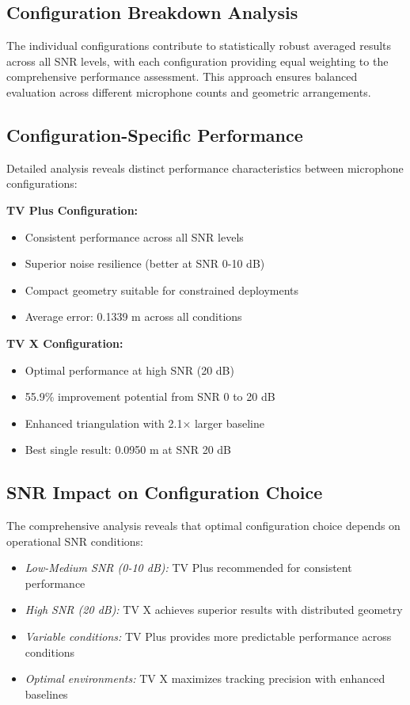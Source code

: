 \documentclass[a4paper]{article}
\begin{document}
\subsection{Configuration Breakdown Analysis}

The individual configurations contribute to statistically robust averaged results across all SNR levels, with each configuration providing equal weighting to the comprehensive performance assessment. This approach ensures balanced evaluation across different microphone counts and geometric arrangements.

\subsection{Configuration-Specific Performance}

Detailed analysis reveals distinct performance characteristics between microphone configurations:

{\bf TV Plus Configuration:}
\begin{itemize}
\item Consistent performance across all SNR levels
\item Superior noise resilience (better at SNR 0-10 dB)
\item Compact geometry suitable for constrained deployments
\item Average error: 0.1339 m across all conditions
\end{itemize}

{\bf TV X Configuration:}
\begin{itemize}
\item Optimal performance at high SNR (20 dB)
\item 55.9\% improvement potential from SNR 0 to 20 dB
\item Enhanced triangulation with 2.1× larger baseline
\item Best single result: 0.0950 m at SNR 20 dB
\end{itemize}

\subsection{SNR Impact on Configuration Choice}

The comprehensive analysis reveals that optimal configuration choice depends on operational SNR conditions:

\begin{itemize}
\item {\em Low-Medium SNR (0-10 dB):} TV Plus recommended for consistent performance
\item {\em High SNR (20 dB):} TV X achieves superior results with distributed geometry
\item {\em Variable conditions:} TV Plus provides more predictable performance across conditions
\item {\em Optimal environments:} TV X maximizes tracking precision with enhanced baselines
\end{itemize}
\end{document}
